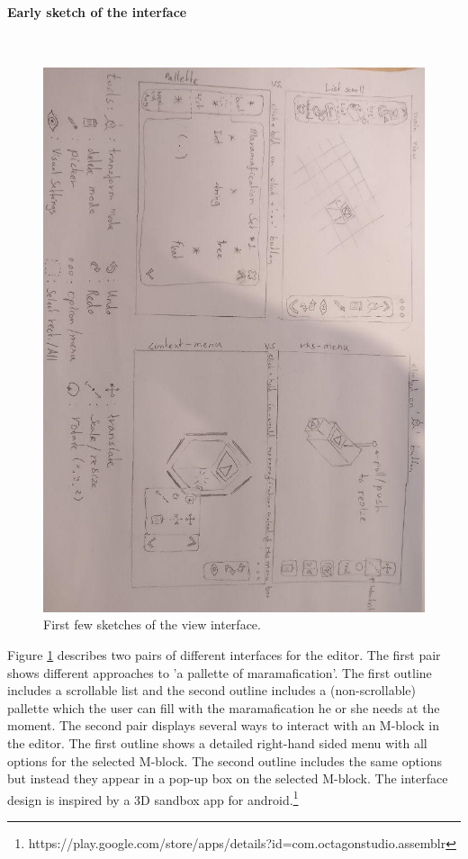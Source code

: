 \documentclass[10pt]{extarticle} %
\newcommand{\myparagraph}[1]{\paragraph{#1}\mbox{}\\} %
\begin{document}
    \myparagraph{Early sketch of the interface}
    \begin{figure}[htb]
        \centering
        \includegraphics[width=11.5cm, angle=90, keepaspectratio]{marama-view-sketch.jpg}
        \caption{First few sketches of the view interface.}
        \label{fig:mvs}
    \end{figure}
    Figure \ref{fig:mvs} describes two pairs of different interfaces for the editor.
    The first pair shows different approaches to 'a pallette of maramafication'.
    The first outline includes a scrollable list and the second outline includes a (non-scrollable) pallette which the user can fill with the maramafication he or she needs at the moment.
    The second pair displays several ways to interact with an M-block in the editor.
    The first outline shows a detailed right-hand sided menu with all options for the selected M-block.
    The second outline includes the same options but instead they appear in a pop-up box on the selected M-block.
    The interface design is inspired by a 3D sandbox app for android.\footnote[1]{https://play.google.com/store/apps/details?id=com.octagonstudio.assemblr}
\end{document}
